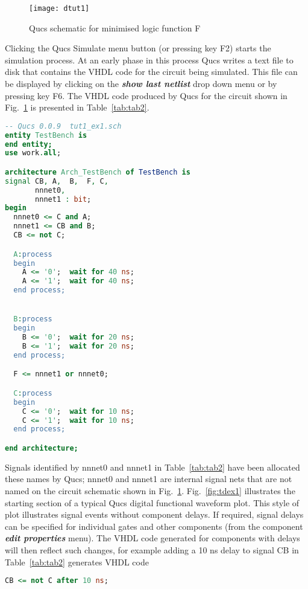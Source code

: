 \begin{figure}[ht]
  \centering
  \texttt{[image: dtut1]}
  \caption{Qucs schematic for minimised logic function F}
  \label{fig:dtut1}
\end{figure} 
\FloatBarrier


Clicking the Qucs Simulate menu button (or pressing key F2) starts the
simulation process. At an early phase in this process Qucs writes a
text file to disk that contains the VHDL code for the circuit being
simulated.  This file can be displayed by clicking on the
\textit{\textbf{show last netlist}} drop down menu or by pressing key
F6. The VHDL code produced by Qucs for the circuit shown in
Fig.~\ref{fig:dtut1} is presented in Table~\ref{tab:tab2}.

\begin{table}
\begin{lstlisting}[language=VHDL]
-- Qucs 0.0.9  tut1_ex1.sch
entity TestBench is
end entity;
use work.all;

architecture Arch_TestBench of TestBench is
signal CB, A,  B,  F, C, 
       nnnet0, 
       nnnet1 : bit;
begin
  nnnet0 <= C and A;
  nnnet1 <= CB and B;
  CB <= not C;

  A:process
  begin
    A <= '0';  wait for 40 ns;
    A <= '1';  wait for 40 ns;
  end process;


  B:process
  begin
    B <= '0';  wait for 20 ns;
    B <= '1';  wait for 20 ns;
  end process;

  F <= nnnet1 or nnnet0;

  C:process
  begin
    C <= '0';  wait for 10 ns;
    C <= '1';  wait for 10 ns;
  end process;

end architecture;
\end{lstlisting}
\caption{VHDL code for the circuit shown in Fig.~\ref{fig:dtut1}}
\label{tab:tab2}
\end{table}
\FloatBarrier

Signals identified by nnnet0 and nnnet1 in Table~\ref{tab:tab2} have
been allocated these names by Qucs; nnnet0 and nnnet1 are internal
signal nets that are not named on the circuit schematic shown in
Fig.~\ref{fig:dtut1}.  Fig.~\ref{fig:tdex1} illustrates the starting
section of a typical Qucs digital functional waveform plot.  This
style of plot illustrates signal events without component delays.  If
required, signal delays can be specified for individual gates and
other components (from the component \textbf{\textit{edit properties}}
menu).  The VHDL code generated for components with delays will then
reflect such changes, for example adding a 10 ns delay to signal CB in
Table~\ref{tab:tab2} generates VHDL code
\begin{lstlisting}[language=VHDL]
CB <= not C after 10 ns;
\end{lstlisting}


